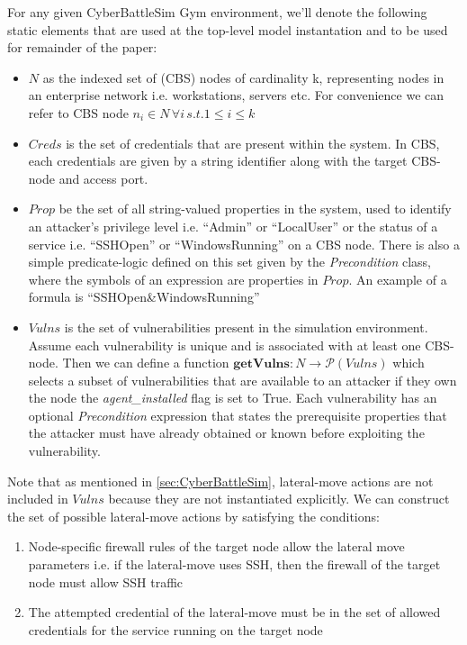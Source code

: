 For any given CyberBattleSim Gym environment, we'll denote the following static elements that are used at the top-level model instantation and to be used for remainder of the paper:
\begin{itemize}
    \item $N$ as the indexed set of (CBS) nodes of cardinality k, representing nodes in an enterprise network i.e. workstations, servers etc. For convenience we can refer to CBS node $n_{i} \in N \,  \forall i \, s.t. 1 \leq i \leq k $
    \item $Creds$ is the set of credentials that are present within the system. In CBS, each credentials are given by a string identifier along with the target CBS-node and access port.
    \item $Prop$ be the set of all string-valued properties in the system, used to identify an attacker's privilege level i.e. ``Admin'' or ``LocalUser'' or the status of a service i.e. ``SSHOpen'' or ``WindowsRunning'' on a CBS node. There is also a simple predicate-logic defined on this set given by the \textit{Precondition} class, where the symbols of an expression are properties in $Prop$. An example of a formula is ``SSHOpen\&WindowsRunning''
    \item $Vulns$ is the set of vulnerabilities present in the simulation environment. Assume each vulnerability is unique and is associated with at least one CBS-node. Then we can define a function $\mathbf{getVulns}: N \rightarrow \mathcal{P}(Vulns)$ which selects a subset of vulnerabilities that are available to an attacker if they own the node the \textit{agent\_installed} flag is set to True. Each vulnerability has an optional \textit{Precondition} expression that states the prerequisite properties that the attacker must have already obtained or known before exploiting the vulnerability.

\end{itemize}
 Note that as mentioned in \ref{sec:CyberBattleSim}, lateral-move actions are not included in $Vulns$ because they are not instantiated explicitly. We can construct the set of possible lateral-move actions by satisfying the conditions:
 \begin{enumerate}
     \item Node-specific firewall rules of the target node allow the lateral move parameters i.e. if the lateral-move uses SSH, then the firewall of the target node must allow SSH traffic
     \item The attempted credential of the lateral-move must be in the set of allowed credentials for the service running on the target node
 \end{enumerate}

